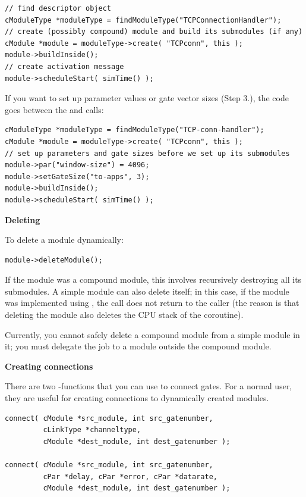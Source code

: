 \begin{verbatim}
// find descriptor object
cModuleType *moduleType = findModuleType("TCPConnectionHandler");
// create (possibly compound) module and build its submodules (if any)
cModule *module = moduleType->create( "TCPconn", this );
module->buildInside();
// create activation message
module->scheduleStart( simTime() );
\end{verbatim}

If you want to set up parameter values or gate vector sizes (Step 3.),
the code goes between the  and
 calls:

\begin{verbatim}
cModuleType *moduleType = findModuleType("TCP-conn-handler");
cModule *module = moduleType->create( "TCPconn", this );
// set up parameters and gate sizes before we set up its submodules
module->par("window-size") = 4096;
module->setGateSize("to-apps", 3);
module->buildInside();
module->scheduleStart( simTime() );
\end{verbatim}


\textbf{Deleting}


To delete a module dynamically:

\begin{verbatim}
module->deleteModule();
\end{verbatim}



If the module was a compound module, this involves recursively
destroying all its submodules. A simple module can also delete itself;
in this case, if the module was implemented using ,
the  call does not return to the caller (the
reason is that deleting the module also deletes the CPU stack of the
coroutine).

Currently, you cannot safely delete a
compound module from a simple module
in it; you must delegate the job to a module outside the compound
module.


\textbf{Creating connections}


There are two -functions that you can use to connect
gates. For a normal user, they are useful for creating connections to
dynamically created modules.

\begin{verbatim}
connect( cModule *src_module, int src_gatenumber,
         cLinkType *channeltype,
         cModule *dest_module, int dest_gatenumber );

connect( cModule *src_module, int src_gatenumber,
         cPar *delay, cPar *error, cPar *datarate,
         cModule *dest_module, int dest_gatenumber );
\end{verbatim}


